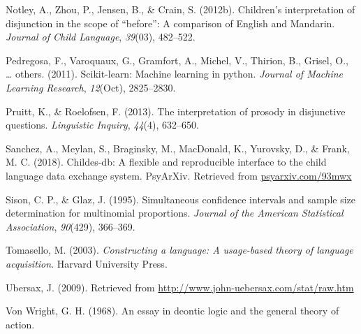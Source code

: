 \documentclass[,man,floatsintext]{apa6}
\begin{document}
\leavevmode\hypertarget{ref-notley2012children}{}%
Notley, A., Zhou, P., Jensen, B., \& Crain, S. (2012b). Children's interpretation of disjunction in the scope of ``before'': A comparison of English and Mandarin. \emph{Journal of Child Language}, \emph{39}(03), 482--522.

\leavevmode\hypertarget{ref-pedregosa2011scikit}{}%
Pedregosa, F., Varoquaux, G., Gramfort, A., Michel, V., Thirion, B., Grisel, O., \ldots{} others. (2011). Scikit-learn: Machine learning in python. \emph{Journal of Machine Learning Research}, \emph{12}(Oct), 2825--2830.

\leavevmode\hypertarget{ref-pruitt2013interpretation}{}%
Pruitt, K., \& Roelofsen, F. (2013). The interpretation of prosody in disjunctive questions. \emph{Linguistic Inquiry}, \emph{44}(4), 632--650.

\leavevmode\hypertarget{ref-sanchez2018childes}{}%
Sanchez, A., Meylan, S., Braginsky, M., MacDonald, K., Yurovsky, D., \& Frank, M. C. (2018). Childes-db: A flexible and reproducible interface to the child language data exchange system. PsyArXiv. Retrieved from \url{psyarxiv.com/93mwx}

\leavevmode\hypertarget{ref-sison1995simultaneous}{}%
Sison, C. P., \& Glaz, J. (1995). Simultaneous confidence intervals and sample size determination for multinomial proportions. \emph{Journal of the American Statistical Association}, \emph{90}(429), 366--369.

\leavevmode\hypertarget{ref-tomasello2003constructing}{}%
Tomasello, M. (2003). \emph{Constructing a language: A usage-based theory of language acquisition}. Harvard University Press.

\leavevmode\hypertarget{ref-ubersax2009}{}%
Ubersax, J. (2009). Retrieved from \url{http://www.john-uebersax.com/stat/raw.htm}

\leavevmode\hypertarget{ref-von1968essay}{}%
Von Wright, G. H. (1968). An essay in deontic logic and the general theory of action.
\end{document}
